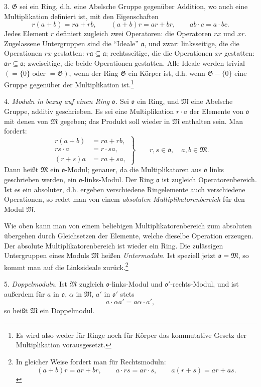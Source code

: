 \documentclass[11pt]{article}
\providecommand{\mG}{\mathfrak{G}}
\providecommand{\mM}{\mathfrak{M}}
\providecommand{\mo}{\mathfrak{o}}
\begin{document}
3. $\mG$ sei ein Ring, d.h. eine Abelsche Gruppe gegenüber Addition, wo auch eine Multiplikation definiert ist, mit den Eigenschaften
\[
        r(a+b)=ra+rb,\qquad (a+b)r=ar+br,\qquad ab\cdot c=a\cdot bc.
\]
Jedes Element $r$ definiert zugleich zwei Operatoren: die Operatoren $rx$ und $xr$. Zugelassene Untergruppen sind die ``Ideale'' $\mathfrak a$, und zwar: linksseitige, die die Operationen $rx$ gestatten: $r\mathfrak a\subseteq\mathfrak a$; rechtsseitige, die die Operationen $xr$ gestatten: $\mathfrak a r\subseteq\mathfrak a$; zweiseitige, die beide Operationen gestatten. Alle Ideale werden trivial $(=\{0\}\text{ oder }=\mG)$, wenn der Ring $\mG$ ein Körper ist, d.h. wenn $\mG-\{0\}$ eine Gruppe gegenüber der Multiplikation ist.\footnote{Es wird also weder für Ringe noch für Körper das kommutative Gesetz der Multiplikation vorausgesetzt.}

4. \emph{Moduln in bezug auf einen Ring $\mo$.} Sei $\mo$ ein Ring, und $\mM$ eine Abelsche Gruppe, additiv geschrieben. Es sei eine Multiplikation $r\cdot a$ der Elemente von $\mo$ mit denen von $\mM$ gegeben; das Produkt soll wieder in $\mM$ enthalten sein. Man fordert:
\[
\left.
\begin{aligned}
 r(a+b)&=ra+rb,\\
 rs\cdot a&=r\cdot sa,\\
 (r+s)a&=ra+sa,
\end{aligned}
\right\}\qquad r,s\in\mo,\quad a,b\in\mM.
\]
Dann heißt $\mM$ ein $\mo$-Modul; genauer, da die Multiplikatoren aus $\mo$ links geschrieben werden, ein $\mo$-links-Modul. Der Ring $\mo$ ist zugleich Operatorenbereich. Ist es ein absoluter, d.h. ergeben verschiedene Ringelemente auch verschiedene Operationen, so redet man von einem \emph{absoluten Multiplikatorenbereich} für den Modul $\mM$.

Wie oben kann man von einem beliebigen Multiplikatorenbereich zum absoluten übergehen durch Gleichsetzen der Elemente, welche dieselbe Operation erzeugen. Der absolute Multiplikatorenbereich ist wieder ein Ring. Die zulässigen Untergruppen eines Moduls $\mM$ heißen \emph{Untermoduln}. Ist speziell jetzt $\mo=\mM$, so kommt man auf die Linksideale zurück.\footnote{In gleicher Weise fordert man für Rechtsmoduln:
\[
(a+b)r=ar+br,\qquad a\cdot rs=ar\cdot s,\qquad a(r+s)=ar+as.
\]}

5. \emph{Doppelmoduln.} Ist $\mM$ zugleich $\mo$-links-Modul und $\mo'$-rechts-Modul, und ist außerdem für $a$ in $\mo$, $\alpha$ in $\mM$, $a'$ in $\mo'$ stets
\[
        a\cdot\alpha a'=a\alpha\cdot a',
\]
so heißt $\mM$ ein Doppelmodul.
\end{document}
